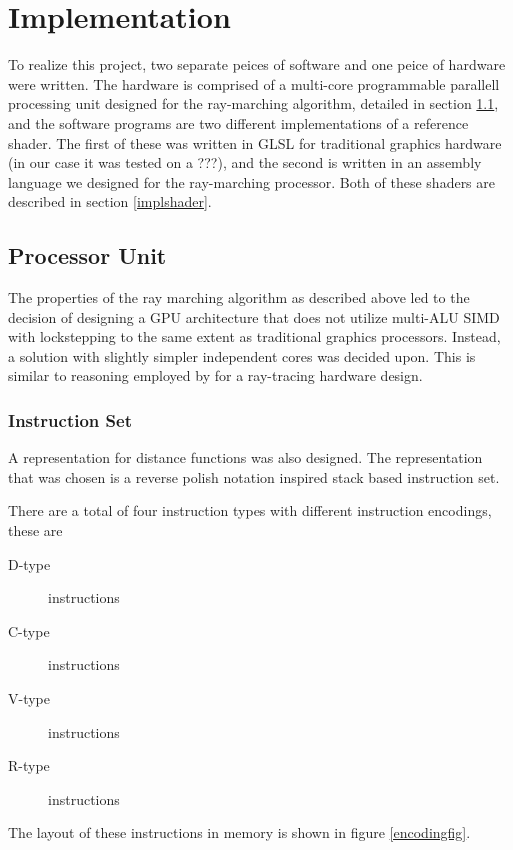 \chapter{Implementation}
	
	To realize this project, two separate peices of software and one peice of
	hardware were written. The hardware is comprised of a multi-core
	programmable parallell processing unit designed for the ray-marching
	algorithm, detailed in section \ref{implproc}, and the software programs
	are two different implementations of a reference shader.  The first of
	these was written in GLSL for traditional graphics hardware (in our case it
	was tested on a ???), and the second is written in an assembly language we
	designed for the ray-marching processor. Both of these shaders are
	described in section \ref{implshader}.
	
	\section{Processor Unit} \label{implproc}

		The properties of the ray marching algorithm as described above led to
		the decision of designing a GPU architecture that does not utilize
		multi-ALU SIMD with lockstepping to the same extent as traditional
		graphics processors. Instead, a solution with slightly simpler
		independent cores was decided upon. This is similar to reasoning
		employed by \cite{Woop2005} for a ray-tracing hardware design.
	
		\subsection{Instruction Set}

			A representation for distance functions was also designed. The
			representation that was chosen is a reverse polish notation
			inspired stack based instruction set.
	
			There are a total of four instruction types with different
			instruction encodings, these are

			\begin{description}
				\item[D-type] instructions
				\item[C-type] instructions
				\item[V-type] instructions
				\item[R-type] instructions
			\end{description}
			The layout of these instructions in memory is shown in figure
			\ref{encodingfig}.
		
